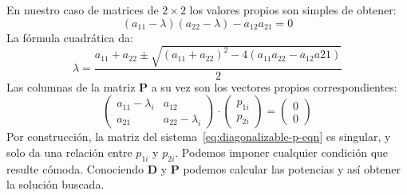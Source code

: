   En nuestro caso de matrices de \(2 \times 2\)
  los valores propios son simples de obtener:%
  \begin{equation}
    \label{eq:diagonalizable-lambda-eqn}
    (a_{11} - \lambda) (a_{22} - \lambda) - a_{12} a_{21}
      = 0
  \end{equation}
  La fórmula cuadrática da:
  \begin{equation}
    \label{eq:diagonalizable-lambda}
    \lambda
      = \frac{a_{11} + a_{22}
		\pm \sqrt{(a_{11} + a_{22})^2
			     - 4 (a_{11} a_{22} - a_{12} a{21})}}
	     {2}
  \end{equation}
  Las columnas de la matriz \(\boldsymbol{P}\) a su vez
  son los vectores propios correspondientes:
  \begin{equation}
    \label{eq:diagonalizable-p-eqn}
    \begin{pmatrix}
      a_{11} - \lambda_i & a_{12} \\
      a_{21}		 & a_{22} - \lambda_i
    \end{pmatrix}
    \cdot
    \begin{pmatrix}
      p_{1 i} \\
      p_{2 i}
    \end{pmatrix}
      =
      \begin{pmatrix}
	0 \\
	0
      \end{pmatrix}
  \end{equation}
  Por construcción,
  la matriz del sistema~\eqref{eq:diagonalizable-p-eqn}
  es singular,
  y solo da una relación entre \(p_{1 i}\) y \(p_{2 i}\).
  Podemos imponer cualquier condición que resulte cómoda.
  Conociendo \(\boldsymbol{D}\) y \(\boldsymbol{P}\)
  podemos calcular las potencias
  y así obtener la solución buscada.

